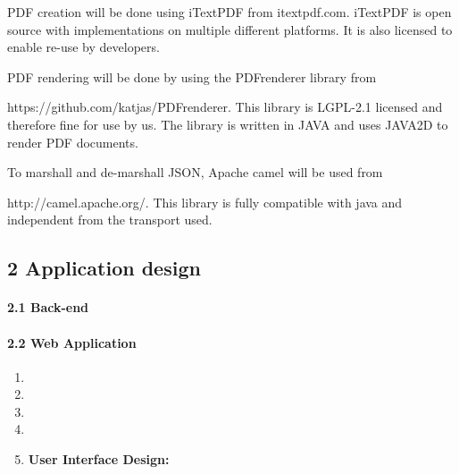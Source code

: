 \documentclass{article}
\begin{document}
 PDF creation will be done using iTextPDF from itextpdf.com. iTextPDF is open source with implementations on multiple different platforms. It is also licensed to enable re-use by developers.



PDF rendering will be done by using the PDFrenderer library from 

https://github.com/katjas/PDFrenderer. This library is LGPL-2.1 licensed and therefore fine for use by us. The library is written in JAVA and uses JAVA2D to render PDF documents.



To marshall and de-marshall JSON, Apache camel will be used from 

http://camel.apache.org/. This library is fully compatible with java and independent from the transport used.




\subsection{2  Application design}

 


\paragraph{2.1  Back-end}

  

     

     

     

     

     

     

 


\paragraph{2.2  Web Application}

\noindent 

\begin{enumerate}
\item  

\item  

\item  

\item  

\item  \textbf{User Interface Design:}
\end{enumerate}
\end{document}
